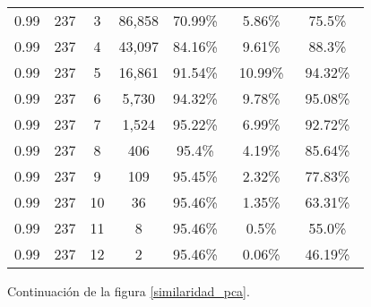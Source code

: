 \begin{figure}[!htbp]
{\begin{tabular}{ |c|c|c|c|c|c|c| }
        0.99             &237             &3            &86,858                 & 70.99\%\     & 5.86\%\               & 75.5\%\ \\
        0.99             &237             &4            &43,097                 & 84.16\%\     & 9.61\%\               & 88.3\%\ \\
        0.99             &237             &5            &16,861                 & 91.54\%\     & 10.99\%\               & 94.32\%\ \\
        0.99             &237             &6            &5,730                 & 94.32\%\     & 9.78\%\               & 95.08\%\ \\
        0.99             &237             &7            &1,524                 & 95.22\%\     & 6.99\%\               & 92.72\%\ \\
        0.99             &237             &8            &406                 & 95.4\%\     & 4.19\%\               & 85.64\%\ \\
        0.99             &237             &9            &109                 & 95.45\%\     & 2.32\%\               & 77.83\%\ \\
        0.99             &237             &10            &36                 & 95.46\%\     & 1.35\%\               & 63.31\%\ \\
        0.99             &237             &11            &8                 & 95.46\%\     & 0.5\%\               & 55.0\%\ \\
        0.99             &237             &12            &2                 & 95.46\%\     & 0.06\%\               & 46.19\%\ \\
        \hline
        \end{tabular}
    }
    \bigskip
    \caption{Continuación de la figura \ref{similaridad_pca}.} \label{similaridad_pca_2}
\end{figure}